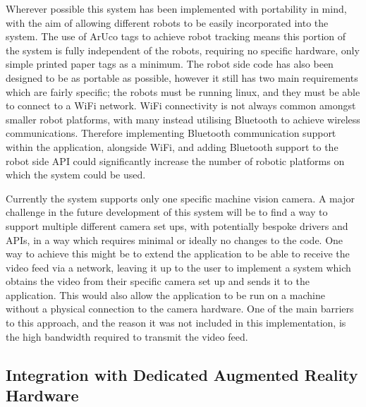 Wherever possible this system has been implemented with portability in mind, with the aim of allowing different robots to be easily incorporated into the system. The use of ArUco tags to achieve robot tracking means this portion of the system is fully independent of the robots, requiring no specific hardware, only simple printed paper tags as a minimum. The robot side code has also been designed to be as portable as possible, however it still has two main requirements which are fairly specific; the robots must be running linux, and they must be able to connect to a WiFi network. WiFi connectivity is not always common amongst smaller robot platforms, with many instead utilising Bluetooth to achieve wireless communications. Therefore implementing Bluetooth communication support within the application, alongside WiFi, and adding Bluetooth support to the robot side API could significantly increase the number of robotic platforms on which the system could be used.

Currently the system supports only one specific machine vision camera. A major challenge in the future development of this system will be to find a way to support multiple different camera set ups, with potentially bespoke drivers and APIs, in a way which requires minimal or ideally no changes to the code. One way to achieve this might be to extend the application to be able to receive the video feed via a network, leaving it up to the user to implement a system which obtains the video from their specific camera set up and sends it to the application. This would also allow the application to be run on a machine without a physical connection to the camera hardware. One of the main barriers to this approach, and the reason it was not included in this implementation, is the high bandwidth required to transmit the video feed.


\subsection{Integration with Dedicated Augmented Reality Hardware}

